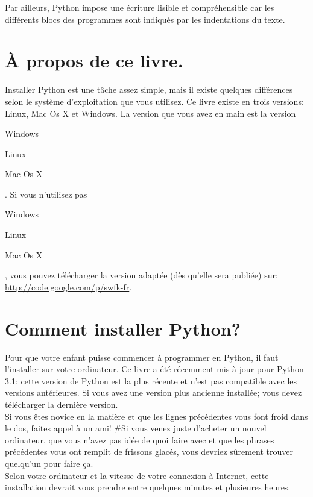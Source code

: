 Par ailleurs, Python impose une écriture lisible et compréhensible car les différents blocs des programmes sont indiqués par les indentations du texte.

\section*{À propos de ce livre.}
Installer Python est une tâche assez simple, mais il existe quelques différences selon le système d'exploitation que vous utilisez. Ce livre existe en trois versions: Linux, Mac Os X et Windows. La version que vous avez en main est la version  \begin{WINDOWS}Windows\end{WINDOWS}\begin{LINUX}Linux\end{LINUX}\begin{MAC}Mac Os X\end{MAC}. Si vous n'utilisez pas \begin{WINDOWS}Windows\end{WINDOWS}\begin{LINUX}Linux\end{LINUX}\begin{MAC}Mac Os X\end{MAC}, vous pouvez télécharger la version adaptée (dès qu'elle sera publiée) sur: \url{http://code.google.com/p/swfk-fr}.
\\
\bigskip
\section*{Comment installer Python?}
Pour que votre enfant puisse commencer à programmer en Python, il faut l'installer sur votre ordinateur. Ce livre a été récemment mis à jour pour Python 3.1: cette version de Python est la plus récente et n'est pas compatible avec les versions antérieures. Si vous avez une version plus ancienne installée; vous devez télécharger la dernière version.
\\
Si vous êtes novice en la matière et que les lignes précédentes vous font froid dans le dos, faites appel à un ami!
#Si vous venez juste d'acheter un nouvel ordinateur, que vous n'avez pas idée de quoi faire avec et que les phrases précédentes vous ont remplit de frissons glacés, vous devriez sûrement trouver quelqu'un pour faire ça.
\\


Selon votre ordinateur et la vitesse de votre connexion à Internet, cette installation devrait vous prendre entre quelques minutes et plusieures heures.

